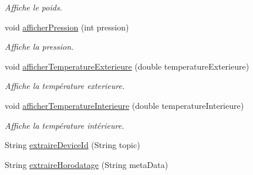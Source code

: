 \begin{DoxyCompactItemize}
\begin{DoxyCompactList}\small\item\em Affiche le poids. \end{DoxyCompactList}\item 
void \hyperlink{classcom_1_1example_1_1bee__honeyt_1_1_i_h_m_mobile_a92bb00501214f2f5f9805a005f1ecdaa}{afficher\+Pression} (int pression)
\begin{DoxyCompactList}\small\item\em Affiche la pression. \end{DoxyCompactList}\item 
void \hyperlink{classcom_1_1example_1_1bee__honeyt_1_1_i_h_m_mobile_af7ce50e9cc663c2c9198bbbb2b7882ff}{afficher\+Temperature\+Exterieure} (double temperature\+Exterieure)
\begin{DoxyCompactList}\small\item\em Affiche la température exterieure. \end{DoxyCompactList}\item 
void \hyperlink{classcom_1_1example_1_1bee__honeyt_1_1_i_h_m_mobile_ac0f55897a183a0887c87954f6fbfdf2f}{afficher\+Temperature\+Interieure} (double temperature\+Interieure)
\begin{DoxyCompactList}\small\item\em Affiche la température intérieure. \end{DoxyCompactList}\item 
String \hyperlink{classcom_1_1example_1_1bee__honeyt_1_1_i_h_m_mobile_ab957cc8fd25c104c48341f7e4141e173}{extraire\+Device\+Id} (String topic)
\item 
String \hyperlink{classcom_1_1example_1_1bee__honeyt_1_1_i_h_m_mobile_ae14deb90573474bc46817312624ebd20}{extraire\+Horodatage} (String meta\+Data)
\end{DoxyCompactItemize}
